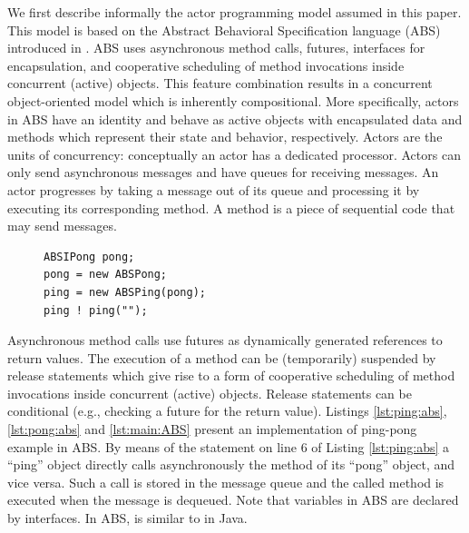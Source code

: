 We first describe informally the actor programming model assumed in this paper. This model is based on the
Abstract Behavioral Specification language (ABS)  
introduced in \cite{johnsen2012abs}.
ABS uses asynchronous method calls, futures, interfaces for encapsulation, 
and cooperative scheduling of method invocations inside concurrent (active) objects. 
This feature combination results in a concurrent object-oriented model which is inherently compositional.
More specifically, actors in ABS  have an identity and behave as active
objects with encapsulated data and methods which represent their state
and behavior, respectively.  Actors are the units of concurrency: conceptually an actor has a dedicated processor. Actors can only send
asynchronous messages and have queues for receiving messages.  An
actor progresses by taking a message out of its queue and processing
it by executing its corresponding method.  A method is a piece of
sequential code that may send messages.
% 
\lstset{language=Java}
\begin{figure}
\vspace{-20pt}
\begin{lstlisting}[caption=main in ABS,label=lst:main:ABS]
ABSIPong pong;
pong = new ABSPong;
ping = new ABSPing(pong);
ping ! ping("");
\end{lstlisting}
\vspace{-20pt}
\end{figure}
% 
Asynchronous method calls use futures as dynamically generated references  to return values.
The execution of a method can be (temporarily) suspended by release statements which give rise to a form
of  cooperative scheduling of method invocations inside concurrent (active) objects.
Release statements can be conditional (e.g., checking a future for the return value).
Listings \ref{lst:ping:abs}, \ref{lst:pong:abs} and \ref{lst:main:ABS} present an implementation of ping-pong example in ABS.
By means of the statement on line 6 of Listing \ref{lst:ping:abs}
a ``ping'' object  directly calls asynchronously the  method  of its ``pong'' object, and vice versa.
Such a call is stored in the message queue and the called method is executed when the message is dequeued.
Note that variables in ABS are declared by interfaces.
In ABS,  is similar to  in Java.

